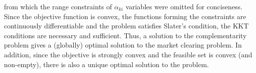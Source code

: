 \documentclass{article}
\begin{document}
from which the range constraints of $\alpha_{ki}$ variables were omitted for conciseness. Since the objective function is convex, the functions forming the constraints are continuously differentiable and the problem satisfies Slater's condition, the KKT conditions are necessary and sufficient. Thus, a solution to the complementarity problem gives a (globally) optimal solution to the market clearing problem. In addition, since the objective is strongly convex and the feasible set is convex (and non-empty), there is also a unique optimal solution to the problem.


\end{document}
